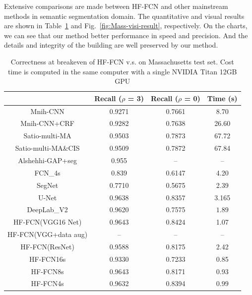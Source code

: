 Extensive comparisons are made between HF-FCN and other mainstream methods in semantic segmentation domain. The quantitative and visual results are shown in Table~\ref{table:Mass-results} and Fig.~\ref{fig:Mass-visi-result}, respectively. On the charts, we can see that our method better performance in speed and precision. And the details and integrity of the building are well preserved by our method.
\begin{table}
\centering
\caption {Correctness at breakeven of HF-FCN v.s. \cite{IEEEexample:mnih2013machine}\cite{IEEEexample:saito2016multiple}\cite{IEEEexample:alshehhi2017simultaneous}\cite{IEEEexample:Long_2015_CVPR}\cite{IEEEexample:badrinarayanan2017segnet}
\cite{IEEEexample:ronneberger2015u}\cite{IEEEexample:chen2016deeplab}on Massachusetts test set. Cost time is computed in the same computer with a single NVIDIA Titan 12GB GPU}
\label{table:Mass-results}
\begin{tabular}{cccc}
\hline
&Recall ($\rho$ = 3)&Recall ($\rho$ = 0)&Time (s)\\
\hline
Mnih-CNN \cite{IEEEexample:mnih2013machine}&0.9271&0.7661&8.70\\
Mnih-CNN+CRF\cite{IEEEexample:mnih2013machine} &0.9282&0.7638&26.60\\
Satio-multi-MA \cite{IEEEexample:saito2016multiple}&0.9503&0.7873&67.72\\
Satio-multi-MA\&CIS \cite{IEEEexample:saito2016multiple}&0.9509&0.7872&67.84\\
Alshehhi-GAP+seg \cite{IEEEexample:alshehhi2017simultaneous}&0.955&{--}&{--} \\ \hline
FCN\_4s\cite{IEEEexample:Long_2015_CVPR}&0.839&0.6147&4.20\\
SegNet\cite{IEEEexample:badrinarayanan2017segnet}&0.7710&0.5675&2.39\\
U-Net\cite{IEEEexample:ronneberger2015u}& $\bm{0.9638}$& $\bm{0.8357}$& 3.165\\
DeepLab\_V2\cite{IEEEexample:chen2016deeplab}&0.9620&0.7575&$\bm{1.89}$\\ \hline
HF-FCN(VGG16 Net)&$\bm{0.9643}$& $\bm{0.8424}$ &1.07\\
HF-FCN(VGG+data aug)&{--}&{--}&{--}\\
HF-FCN(ResNet)&0.9588&0.8175&2.42\\
HF-FCN16s &0.9330&0.7233&0.85\\
HF-FCN8s &0.9643&0.8171&0.93\\
HF-FCN4s &0.9632&0.8394&$\bm{0.99}$\\
\hline
\end{tabular}
\end{table}


